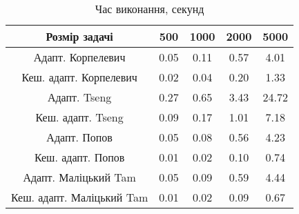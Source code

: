 \begin{table}[H]
	\centering
	\begin{tabular}{|c||c|c|c|c|}\hline
		Розмір задачі & 500 & 1000 & 2000 & 5000 \\ \hline \hline
		Адапт. Корпелевич & 0.05 & 0.11 & 0.57 & 4.01 \\ \hline
		Кеш. адапт. Корпелевич & 0.02 & 0.04 & 0.20 & 1.33 \\ \hline
		Адапт. Tseng & 0.27 & 0.65 & 3.43 & 24.72 \\ \hline
		Кеш. адапт. Tseng & 0.09 & 0.17 & 1.01 & 7.18 \\ \hline
		Адапт. Попов & 0.05 & 0.08 & 0.56 & 4.23 \\ \hline
		Кеш. адапт. Попов & 0.01 & 0.02 & 0.10 & 0.74 \\ \hline
		Адапт. Маліцький Tam & 0.05 & 0.09 & 0.59 & 4.44 \\ \hline
		Кеш. адапт. Маліцький Tam & 0.01 & 0.02 & 0.09 & 0.67 \\ \hline
	\end{tabular}
	\caption{Час виконання, секунд}
\end{table}
